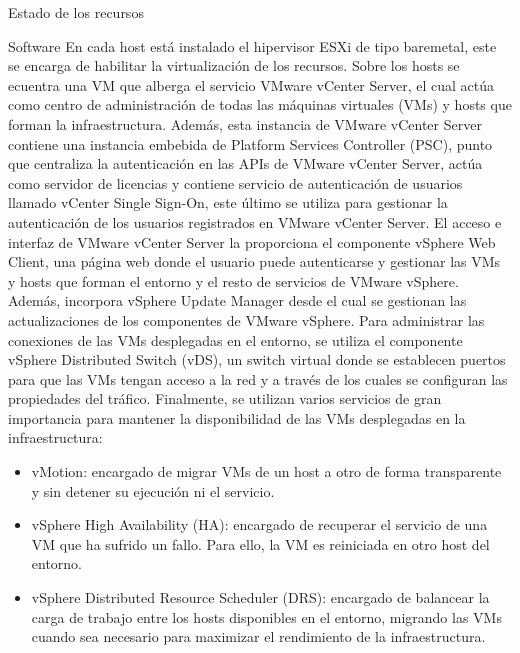 \begin{chapter}{Estado de los recursos}
\begin{section}{Software}
    En cada host está instalado el hipervisor ESXi de tipo baremetal, este se encarga de habilitar la virtualización de los recursos. Sobre los hosts se ecuentra una VM que alberga el servicio VMware vCenter Server, el cual actúa como centro de administración de todas las máquinas virtuales (VMs) y hosts que forman la infraestructura. Además, esta instancia de VMware vCenter Server contiene una instancia embebida de Platform Services Controller (PSC), punto que centraliza la autenticación en las APIs de VMware vCenter Server, actúa como servidor de licencias y contiene servicio de autenticación de usuarios llamado vCenter Single Sign-On, este último se utiliza para gestionar la autenticación de los usuarios registrados en VMware vCenter Server. El acceso e interfaz de VMware vCenter Server la proporciona el componente vSphere Web Client, una página web donde el usuario puede autenticarse y gestionar las VMs y hosts que forman el entorno y el resto de servicios de VMware vSphere. Además, incorpora vSphere Update Manager desde el cual se gestionan las actualizaciones de los componentes de VMware vSphere. Para administrar las conexiones de las VMs desplegadas en el entorno, se utiliza el componente vSphere Distributed Switch (vDS), un switch virtual donde se establecen puertos para que las VMs tengan acceso a la red y a través de los cuales se configuran las propiedades del tráfico. Finalmente, se utilizan varios servicios de gran importancia para mantener la disponibilidad de las VMs desplegadas en la infraestructura:
    
    \begin{itemize}
        \item vMotion: encargado de migrar VMs de un host a otro de forma transparente y sin detener su ejecución ni el servicio.
        
        \item vSphere High Availability (HA): encargado de recuperar el servicio de una VM que ha sufrido un fallo. Para ello, la VM es reiniciada en otro host del entorno.
        
        \item vSphere Distributed Resource Scheduler (DRS): encargado de balancear la carga de trabajo entre los hosts disponibles en el entorno, migrando las VMs cuando sea necesario para maximizar el rendimiento de la infraestructura. 
        

\end{itemize}
\end{section}
\end{chapter}
